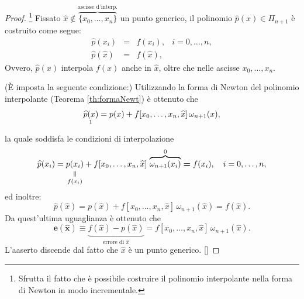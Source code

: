 \begin{proof}
    \footnote{Sfrutta il fatto che è possibile costruire il polinomio interpolante nella forma di Newton in modo incrementale.} Fissato $\widehat x\notin\overbrace{\{x_0,\hdots,x_n\}}^{\text{ascisse d'interp.}}$ un punto generico, il polinomio $\widehat p(x)\in\Pi_{n+1}$ è costruito come segue:
    \begin{equation*}
        \begin{matrix}
            \widehat p(x_i)&=&f(x_i),& i=0,\hdots,n,\\
        \widehat p(\widehat x) &=& f(\widehat x),
        \end{matrix}
    \end{equation*}
    Ovvero, $\widehat p(x)$ interpola $f(x)$ anche in $\widehat x$, oltre che nelle ascisse $x_0,\hdots,x_n$.
    
    (È imposta la seguente condizione:) Utilizzando la forma di Newton del polinomio interpolante (Teorema \ref{th:formaNewt}) è ottenuto che
    \begin{equation*}
        \underset{\footnotemark}{\widehat p(x)} = p(x) + f[x_0,\hdots,x_n,\widehat x]\,\omega_{n+1}(x),
    \end{equation*}
    la quale soddisfa le condizioni di interpolazione
    \begin{equation*}
        \widehat p(x_i)=\equalto{p(x_i)}{f(x_i)} + f[x_0,\hdots,x_n,\widehat x]\,\overbrace{\omega_{n+1}(x_i)}^{0} \boldsymbol = f(x_i),\quad i=0,\hdots,n,
    \end{equation*}
    ed inoltre:
    \begin{equation*}
        \widehat p(\widehat x)=p(\widehat x)+ f[x_0,\hdots,x_n,\widehat x]\,\omega_{n+1}(\widehat x)\boldsymbol = f(\widehat x).
    \end{equation*}
    Da quest'ultima uguaglianza è ottenuto che
    \begin{equation*}
        \boldsymbol{e(\widehat x)\equiv} \underbrace{f(\widehat x) - p(\widehat x)}_{\text{errore di $\widehat x$}}=f[x_0,\hdots,x_n,\widehat x]\,\omega_{n+1}(\widehat x).
    \end{equation*}
    L'aaserto discende dal fatto che $\widehat x$ è un punto generico. [\footnotemark]
\end{proof}

\addtocounter{footnote}{-1}

